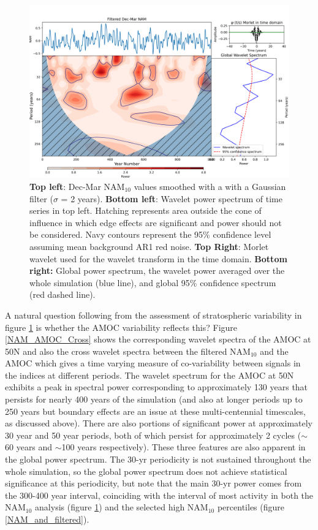 \begin{figure}[h!]
\begin{center}
\noindent\includegraphics[width = 0.8\linewidth]{Figures/Figures-surface/NAM_wavelet_UKESM.png}
\caption{\textbf{Top left}: Dec-Mar NAM$_{10}$ values smoothed with a with a Gaussian filter ($\sigma$ = 2 years). \textbf{Bottom left}: Wavelet power spectrum of time series in top left. Hatching represents area outside the cone of influence in which edge effects are significant and power should not be considered. Navy contours represent the 95\% confidence level assuming mean background AR1 red noise. \textbf{Top Right}: Morlet wavelet used for the wavelet transform in the time domain. \textbf{Bottom right:} Global power spectrum, the wavelet power averaged over the whole simulation (blue line), and global 95\% confidence spectrum (red dashed line).}
\label{NAM_wavelet}
\end{center}
\end{figure}

A natural question following from the assessment of stratospheric variability in figure \ref{NAM_wavelet} is whether the AMOC variability reflects this? Figure \ref{NAM_AMOC_Cross} shows the corresponding wavelet spectra of the AMOC at 50N and also the cross wavelet spectra between the filtered NAM$_{10}$ and the AMOC which gives a time varying measure of co-variability between signals in the indices at different periods. The wavelet spectrum for the AMOC at 50N exhibits a peak in spectral power corresponding to approximately 130 years that persists for nearly 400 years of the simulation (and also at longer periods up to 250 years but boundary effects are an issue at these multi-centennial timescales, as discussed above). There are also portions of significant power at approximately 30 year and 50 year periods, both of which persist for approximately 2 cycles ($\sim$60 years and $\sim$100 years respectively). These three features are also apparent in the global power spectrum. The 30-yr periodicity is not sustained throughout the whole simulation, so the global power spectrum does not achieve statistical significance at this periodicity, but note that the main 30-yr power comes from the 300-400 year interval, coinciding with the interval of most activity in both the NAM$_{10}$ analysis (figure \ref{NAM_wavelet}) and the selected high NAM$_{10}$ percentiles (figure \ref{NAM_and_filtered}). 
 
